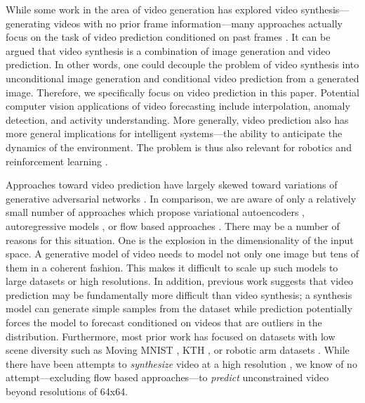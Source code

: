 \documentclass{article}
\begin{document}
While some work in the area of video generation \cite{clark2020adversarial, VondrickPT16, saito2018} has explored video synthesis---generating videos with no prior frame information---many approaches actually focus on the task of video prediction conditioned on past frames \cite{RanzatoSBMCC14, SrivastavaMS15, patraucean2015spatiotemporal, MathieuCL15, lee2018savp, babaeizadeh2018stochastic, OliuSE18, XiongL00L18, Xue0BF16, Finn16, luc2020}. It can be argued that video synthesis is a combination of image generation and video prediction. In other words, one could decouple the problem of video synthesis into unconditional image generation and conditional video prediction from a generated image. Therefore, we specifically focus on video prediction in this paper. Potential computer vision applications of video forecasting include interpolation, anomaly detection, and activity understanding. More generally, video prediction also has more general implications for intelligent systems---the ability to anticipate the dynamics of the environment. The problem is thus also relevant for robotics and reinforcement learning \cite{Finn16, Ebert17, OhGLLS15, ha2018world, RacaniereWRBGRB17}.

Approaches toward video prediction have largely skewed toward variations of generative adversarial networks \cite{MathieuCL15, lee2018savp, clark2020adversarial, VondrickPT16, luc2020}. In comparison, we are aware of only a relatively small number of approaches which propose variational autoencoders \cite{babaeizadeh2018stochastic, Xue0BF16, denton18a}, autoregressive models \cite{KalchbrennerOSD17, WeissenbornTU20}, or flow based approaches \cite{KumarBEFLDK20}. There may be a number of reasons for this situation. One is the explosion in the dimensionality of the input space. A generative model of video needs to model not only one image but tens of them in a coherent fashion. This makes it difficult to scale up such models to large datasets or high resolutions. In addition, previous work \cite{clark2020adversarial} suggests that video prediction may be fundamentally more difficult than video synthesis; a synthesis model can generate simple samples from the dataset while prediction potentially forces the model to forecast conditioned on videos that are outliers in the distribution. Furthermore, most prior work has focused on datasets with low scene diversity such as Moving MNIST \cite{SrivastavaMS15}, KTH \cite{KTH}, or robotic arm datasets \cite{Finn16, Ebert17}.
While there have been attempts to \emph{synthesize} video at a high resolution \cite{clark2020adversarial}, we know of no attempt---excluding flow based approaches---to \emph{predict} unconstrained video beyond resolutions of 64x64.
\end{document}
